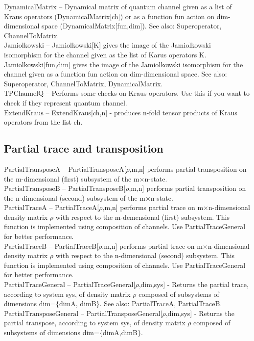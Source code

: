 \noindent\textbf{$ \text{DynamicalMatrix} $ }-- Dynamical matrix of quantum channel given as a list of Kraus operators (DynamicalMatrix[ch]) or as a function fun action on dim-dimensional space (DynamicalMatrix[fun,dim]). See also: Superoperator, ChannelToMatrix.$  $\\
\noindent\textbf{$ \text{Jamiolkowski} $ }-- Jamiolkowski[K] gives the image of the Jamiolkowski isomorphism for the channel given as the list of Karus operators K. Jamiolkowski[fun,dim] gives the image of the Jamiolkowski isomorphism for the channel given as a function fun action on dim-dimensional space. See also: Superoperator, ChannelToMatrix, DynamicalMatrix.$  $\\
\noindent\textbf{$ \text{TPChannelQ} $ }-- Performs some checks on Kraus operators. Use this if you want to check if they represent quantum channel.$  $\\
\noindent\textbf{$ \text{ExtendKraus} $ }-- ExtendKraus[ch,n] - produces n-fold tensor products of Kraus operators from the list ch.$  $\\
\subsection{Partial trace and transposition}

\noindent\textbf{$ \text{PartialTransposeA} $ }-- PartialTransposeA[$\rho $,m,n] performs partial transposition on the m-dimensional (first) subsystem of the m$\times $n-state.$  $\\
\noindent\textbf{$ \text{PartialTransposeB} $ }-- PartialTransposeB[$\rho $,m,n] performs partial transposition on the n-dimensional (second) subsystem of the m$\times $n-state.$  $\\
\noindent\textbf{$ \text{PartialTraceA} $ }-- PartialTraceA[$\rho $,m,n] performs partial trace on m$\times $n-dimensional density matrix $\rho $ with respect to the m-demensional (first) subsystem. This function is implemented using composition of channels. Use PartialTraceGeneral for better performance.$  $\\
\noindent\textbf{$ \text{PartialTraceB} $ }-- PartialTraceB[$\rho $,m,n] performs partial trace on m$\times $n-dimensional density matrix $\rho $ with respect to the n-dimensional (second) subsystem. This function is implemented using composition of channels. Use PartialTraceGeneral for better performance.$  $\\
\noindent\textbf{$ \text{PartialTraceGeneral} $ }-- PartialTraceGeneral[$\rho $,dim,sys] - Returns the partial trace, according to system sys, of density matrix $\rho $ composed of subsystems of dimensions dim=$\{$dimA, dimB$\}$. See also: PartialTraceA, PartialTraceB.$  $\\
\noindent\textbf{$ \text{PartialTransposeGeneral} $ }-- PartialTransposeGeneral[$\rho $,dim,sys] - Returns the partial transpose, according to system sys, of density matrix $\rho $ composed of subsystems of dimensions dim=$\{$dimA,dimB$\}$. $  $\\
